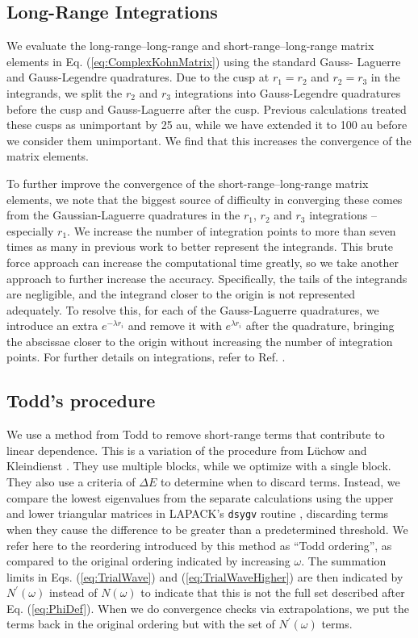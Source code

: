 \documentclass[preprint,showpacs,showkeys,preprintnumbers,amsmath,amssymb,longbibliography,pra,aps]{revtex4-1}
\begin{document}
\subsection{Long-Range Integrations}
\label{sec:LongInt}
We evaluate the long-range--long-range and short-range--long-range matrix 
elements in Eq. (\ref{eq:ComplexKohnMatrix}) using the standard Gauss-
Laguerre and Gauss-Legendre quadratures. Due to the cusp at $r_1 = r_2$ and
$r_2 = r_3$ in the integrands, we split the $r_2$ and $r_3$ integrations into 
Gauss-Legendre quadratures before the cusp and Gauss-Laguerre after the cusp. 
Previous calculations \cite{VanReeth2003,VanReeth2004} treated these cusps as 
unimportant by 25 au, while we have extended it to 100 au before we consider 
them unimportant. We find that this increases the convergence of the matrix 
elements.

To further improve the convergence of the short-range--long-range matrix 
elements, we note that the biggest source of difficulty in converging these 
comes from the Gaussian-Laguerre quadratures in the $r_1$, $r_2$ and $r_3$ 
integrations -- especially $r_1$. We increase the number of integration 
points to more than seven times as many in previous work
\cite{VanReeth2003,VanReeth2004} to better represent the integrands. This
brute force approach 
can increase the computational time greatly, so we take another approach to 
further increase the accuracy. Specifically, the tails of the integrands are 
negligible, and the integrand closer to the origin is not represented 
adequately. To resolve this, for each of the Gauss-Laguerre quadratures, we 
introduce an extra $e^{-\lambda r_i}$ and remove it with $e^{\lambda r_i}$ 
after the quadrature, bringing the abscissae closer to the origin without 
increasing the number of integration points. For further details on 
integrations, refer to Ref. \cite{WoodsDiss2015}.

\subsection{Todd's procedure}
\label{sec:Todd}
We use a method from Todd \cite{Todd2007} to remove short-range terms that 
contribute to linear dependence. This is a variation of the procedure from
L\"uchow and Kleindienst \cite{Luchow1992}. They use multiple blocks, while we 
optimize with a single block. They also use a criteria of $\Delta E$ to 
determine when to discard terms. Instead, we compare the lowest eigenvalues 
from the separate calculations using the upper and lower triangular matrices 
in LAPACK's \texttt{dsygv} routine \cite{LAPACK}, discarding terms when they 
cause the difference to be greater than a predetermined threshold. We refer 
here to the reordering introduced by this method as ``Todd ordering'', as 
compared to the original ordering indicated by increasing $\omega$. The 
summation limits in Eqs. (\ref{eq:TrialWave}) and (\ref{eq:TrialWaveHigher}) 
are then indicated by $N^\prime(\omega)$ instead of $N(\omega)$ to indicate 
that this is not the full set described after Eq. (\ref{eq:PhiDef}). When we 
do convergence checks via extrapolations, we put the terms back in the 
original ordering but with the set of $N^\prime(\omega)$ terms.
\end{document}
